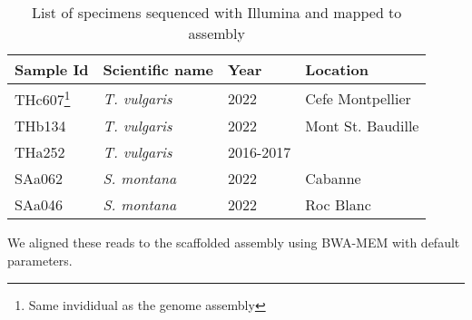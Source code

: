 \begin{table}[h!]
    \begin{minipage}{\linewidth}
    \renewcommand\thefootnote{\thempfootnote}
    \centering
    \begin{tabular}{@{}llll@{}}
    \toprule
    Sample Id & Scientific name                      & Year & Location     \\ \midrule
    THc607\footnote{Same invididual as the genome assembly}    & \textit{T. vulgaris}                          & 2022   &  Cefe Montpellier  \\
    THb134    & \textit{T. vulgaris}                 & 2022  & Mont St. Baudille   \\
    THa252    & \textit{T. vulgaris}                 & 2016-2017 & \\
    SAa062    & \textit{S. montana} & 2022 & Cabanne     \\
    SAa046    & \textit{S. montana} & 2022  & Roc Blanc    \\ \bottomrule
    \end{tabular}
    \caption{List of specimens sequenced with Illumina and mapped to assembly}
    \label{tab:illumina_samples}
    \end{minipage}
    \end{table}

We aligned these reads to the scaffolded assembly using BWA-MEM with default parameters. ~\cite{liAligningSequenceReads2013}

